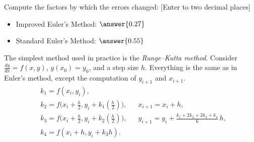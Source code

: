 \documentclass{ximera}
\begin{document}
\begin{exercise}
\begin{problem}
\begin{problem}
\begin{problem}
\begin{itemize}
\begin{itemize}
                    \end{itemize}
                    \begin{problem}
                        Compute the factors by which the errors changed: [Enter to two decimal places]
                        \begin{itemize}
                            \item Improved Euler's Method: $\answer{0.27}$
                            \item Standard Euler's Method: $\answer{0.55}$
                        \end{itemize}
                    \end{problem}
                \end{itemize}
            \end{problem}
        \end{problem}
    \end{problem}
\end{exercise}


The simplest method used in practice is the \emph{Runge--Kutta method}. Consider $\frac{dy}{dx}=f(x,y)$, $y(x_0) = y_0$, and a step size $h$.  Everything is the same as in Euler's method, except the computation of $y_{i+1}$ and $x_{i+1}$.
\begin{align*}
    & k_1 = f(x_i,y_i) , & & \\
    & k_2 = f\bigl(x_i + \frac{h}{2},y_i + k_1 (\frac{h}{2})\bigr) ,
    & & 
    x_{i+1} = x_i + h , \\
    & k_3 = f\bigl(x_i + \frac{h}{2},y_i + k_2 (\frac{h}{2})\bigr) ,
    & &
    y_{i+1} = y_i + \frac{k_1 + 2k_2 + 2k_3 + k_4}{6}\,h ,  \\
    & k_4 = f(x_i + h,y_i + k_3 h) .
\end{align*}
\end{document}
